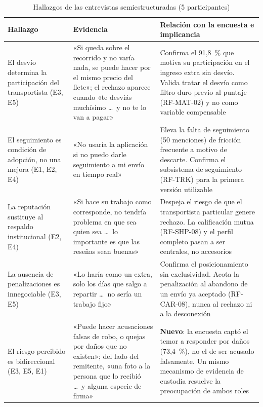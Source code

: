 {%
\begin{table}[htbp]
	\caption{Hallazgos de las entrevistas semiestructuradas (5 participantes)}
	\label{tab:entrevistas}
	\centering
	\scriptsize
	\begin{tabular}{p{3.5cm}p{5.1cm}p{5.4cm}}
		\toprule
		\textbf{Hallazgo} & \textbf{Evidencia} & \textbf{Relación con la encuesta e implicancia} \\
		\midrule
		El desvío determina la participación del transportista (E3, E5) &
		«Si queda sobre el recorrido y no varía nada, se puede hacer por el mismo precio del flete»; el rechazo aparece cuando «te desviás muchísimo \ldots\ y no te lo van a pagar» &
		Confirma el 91,8~\% que motiva su participación en el ingreso extra sin desvío. Valida tratar el desvío como filtro duro previo al puntaje (RF-MAT-02) y no como variable compensable \\
		\addlinespace
		El seguimiento es condición de adopción, no una mejora (E1, E2, E4) &
		«No usaría la aplicación si no puedo darle seguimiento a mi envío en tiempo real» &
		Eleva la falta de seguimiento (50 menciones) de fricción frecuente a motivo de descarte. Confirma el subsistema de seguimiento (RF-TRK) para la primera versión utilizable \\
		\addlinespace
		La reputación sustituye al respaldo institucional (E2, E4) &
		«Si hace su trabajo como corresponde, no tendría problema en que sea quien sea \ldots\ lo importante es que las reseñas sean buenas» &
		Despeja el riesgo de que el transportista particular genere rechazo. La calificación mutua (RF-SHP-08) y el perfil completo pasan a ser centrales, no accesorios \\
		\addlinespace
		La ausencia de penalizaciones es innegociable (E3, E5) &
		«Lo haría como un extra, solo los días que salgo a repartir \ldots\ no sería un trabajo fijo» &
		Confirma el posicionamiento sin exclusividad. Acota la penalización al abandono de un envío ya aceptado (RF-CAR-08), nunca al rechazo ni a la desconexión \\
		\addlinespace
		El riesgo percibido es bidireccional (E3, E5, E1) &
		«Puede hacer acusaciones falsas de robo, o quejas por daños que no existen»; del lado del remitente, «una foto a la persona que lo recibió \ldots\ y alguna especie de firma» &
		\textbf{Nuevo}: la encuesta captó el temor a responder por daños (73,4~\%), no el de ser acusado falsamente. Un mismo mecanismo de evidencia de custodia resuelve la preocupación de ambos roles \\

\end{tabular}
\end{table}}
